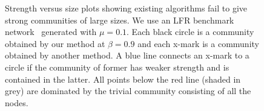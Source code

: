 \begin{figure}[t]
    \centering
    \def\svgwidth{\columnwidth}
    \fontsize{10}{10}\selectfont
    
    \hfill
    \vspace{-.5em}
    \caption{
   		 Strength versus size plots showing existing algorithms fail to give strong communities of
		 large sizes. We use an LFR benchmark network~\cite{lancichinetti2009benchmarks} generated
		 with $\mu=0.1$. Each black circle is a community obtained by our method at $\beta = 0.9$ and
		 each {\sffamily x}-mark is a community obtained by another method.
		 A blue line connects an {\sffamily x}-mark to a circle if the community of former has weaker strength and is contained in the latter.
		 All points below the red line (shaded in grey) are dominated by the trivial community consisting of all the nodes.
    }

  \label{fig:LFR}
\end{figure}


